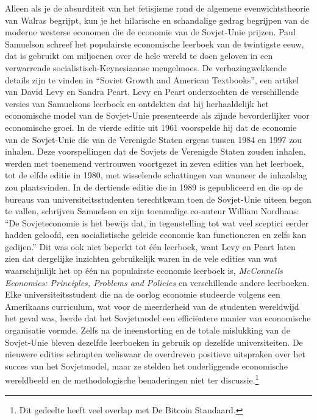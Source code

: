Alleen als je de absurditeit van het fetisjisme rond de algemene evenwichtstheorie van Walras begrijpt, kun je het hilarische en schandalige gedrag begrijpen van de moderne westerse economen die de economie van de Sovjet-Unie prijzen. Paul Samuelson schreef het populairste economische leerboek van de twintigste eeuw, dat is gebruikt om miljoenen over de hele wereld te doen geloven in een verwarrende socialistisch-Keynesiaanse mengelmoes. De verbazingwekkende details zijn te vinden in ``Soviet Growth and American Textbooks'', een artikel van David Levy en Sandra Peart.\autocite{142} Levy en Peart onderzochten de verschillende versies van Samuelsons leerboek en ontdekten dat hij herhaaldelijk het economische model van de Sovjet-Unie presenteerde als zijnde bevorderlijker voor economische groei. In de vierde editie uit 1961 voorspelde hij dat de economie van de Sovjet-Unie die van de Verenigde Staten ergens tussen 1984 en 1997 zou inhalen. Deze voorspellingen dat de Sovjets de Verenigde Staten zouden inhalen, werden met toenemend vertrouwen voortgezet in zeven edities van het leerboek, tot de elfde editie in 1980, met wisselende schattingen van wanneer de inhaalslag zou plaatsvinden. In de dertiende editie die in 1989 is gepubliceerd en die op de bureaus van universiteitsstudenten terechtkwam toen de Sovjet-Unie uiteen begon te vallen, schrijven Samuelson en zijn toenmalige co-auteur William Nordhaus: ``De Sovjeteconomie is het bewijs dat, in tegenstelling tot wat veel sceptici eerder hadden geloofd, een socialistische geleide economie kan functioneren en zelfs kan gedijen.''\autocite{143} Dit was ook niet beperkt tot één leerboek, want Levy en Peart laten zien dat dergelijke inzichten gebruikelijk waren in de vele edities van wat waarschijnlijk het op één na populairste economie leerboek is, \emph{McConnell\textquotesingle s Economics: Principles, Problems and Policies} en verschillende andere leerboeken.\autocite{144} Elke universiteitsstudent die na de oorlog economie studeerde volgens een Amerikaans curriculum, wat voor de meerderheid van de studenten wereldwijd het geval was, leerde dat het Sovjetmodel een efficiëntere manier van economische organisatie vormde. Zelfs na de ineenstorting en de totale mislukking van de Sovjet-Unie bleven dezelfde leerboeken in gebruik op dezelfde universiteiten. De nieuwere edities schrapten weliswaar de overdreven positieve uitspraken over het succes van het Sovjetmodel, maar ze stelden het onderliggende economische wereldbeeld en de methodologische benaderingen niet ter discussie.\footnote{Dit gedeelte heeft veel overlap met De Bitcoin Standaard.}


